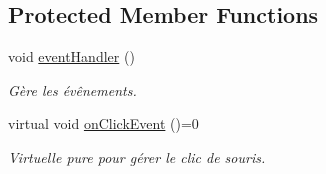 \subsection*{Protected Member Functions}
\begin{DoxyCompactItemize}
\item 
\hypertarget{classAbstractButton_a15394cc151c318ea2bd66a53a978cfcb}{void \hyperlink{classAbstractButton_a15394cc151c318ea2bd66a53a978cfcb}{event\+Handler} ()}\label{classAbstractButton_a15394cc151c318ea2bd66a53a978cfcb}

\begin{DoxyCompactList}\small\item\em Gère les évênements. \end{DoxyCompactList}\item 
\hypertarget{classAbstractButton_a06155e27d4445be22b9444f21bc31567}{virtual void \hyperlink{classAbstractButton_a06155e27d4445be22b9444f21bc31567}{on\+Click\+Event} ()=0}\label{classAbstractButton_a06155e27d4445be22b9444f21bc31567}

\begin{DoxyCompactList}\small\item\em Virtuelle pure pour gérer le clic de souris. \end{DoxyCompactList}\end{DoxyCompactItemize}
